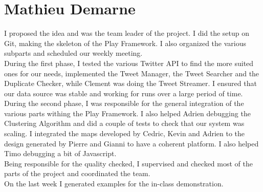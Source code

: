 \section{Mathieu Demarne}

I proposed the idea and was the team leader of the project. I did the setup on Git, making the skeleton of the Play Framework. I also organized the various subparts and scheduled our weekly meeting.\\
During the first phase, I tested the various Twitter API to find the more suited ones for our needs, implemented the Tweet Manager, the Tweet Searcher and the Duplicate Checker, while Clement was doing the Tweet Streamer. I ensured that our data source was stable and working for runs over a large period of time. \\
During the second phase, I was responsible for the general integration of the various parts withing the Play Framework. I also helped Adrien debugging the Clustering Algorithm and did a couple of tests to check that our system was scaling. I integrated the maps developed by Cedric, Kevin and Adrien to the design generated by Pierre and Gianni to have a coherent platform. I also helped Timo debugging a bit of Javascript. \\
Being responsible for the quality checked, I supervised and checked most of the parts of the project and coordinated the team. \\
On the last week I generated examples for the in-class demonstration.